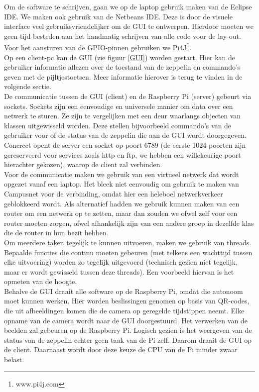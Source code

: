 \documentclass[eind]{penoverslag}
\begin{document}
Om de software te schrijven, gaan we op de laptop gebruik maken van de Eclipse IDE. We maken ook gebruik van de Netbeans IDE. Deze is door de visuele interface veel gebruiksvriendelijker om de GUI te ontwerpen. Hierdoor moeten we geen tijd besteden aan het handmatig schrijven van alle code voor de lay-out. Voor het aansturen van de GPIO-pinnen gebruiken we Pi4J\footnote{www.pi4j.com}.\\

Op een client-pc kan de GUI (zie figuur \ref{GUI}) worden gestart. Hier kan de gebruiker informatie aflezen over de toestand van de zeppelin en commando's geven met de pijltjestoetsen. Meer informatie hierover is terug te vinden in de volgende sectie. \\

De communicatie tussen de GUI (client) en de Raspberry Pi (server) gebeurt via sockets. Sockets zijn een eenvoudige en universele manier om data over een netwerk te sturen. Ze zijn te vergelijken met een deur waarlangs objecten van klassen uitgewisseld worden. Deze stellen bijvoorbeeld commando's van de gebruiker voor of de status van de zeppelin die aan de GUI wordt doorgegeven. Concreet opent de server een socket op poort 6789 (de eerste 1024 poorten zijn gereserveerd voor services zoals http en ftp, we hebben een willekeurige poort hierachter gekozen), waarop de client zal verbinden. \\

Voor de communicatie maken we gebruik van een virtueel netwerk dat wordt opgezet vanaf een laptop. Het bleek niet eenvoudig om gebruik te maken van Campusnet voor de verbinding, omdat hier een heleboel netwerkverkeer geblokkeerd wordt. Als alternatief hadden we gebruik kunnen maken van een router om een netwerk op te zetten, maar dan zouden we ofwel zelf voor een router moeten zorgen, ofwel afhankelijk zijn van een andere groep in dezelfde klas die de router in hun bezit hebben. \\

Om meerdere taken tegelijk te kunnen uitvoeren, maken we gebruik van threads. Bepaalde functies die continu moeten gebeuren (met telkens een wachttijd tussen elke uitvoering) worden zo tegelijk uitgevoerd (technisch gezien niet tegelijk, maar er wordt gewisseld tussen deze threads). Een voorbeeld hiervan is het opmeten van de hoogte.\\

Behalve de GUI draait alle software op de Raspberry Pi, omdat die autonoom moet kunnen werken. Hier worden beslissingen genomen op basis van QR-codes, die uit afbeeldingen komen die de camera op geregelde tijdstippen neemt. Elke opname van de camera wordt naar de GUI doorgestuurd. Het verwerken van de beelden zal gebeuren op de Raspberry Pi. Logisch gezien is het weergeven van de status van de zeppelin echter geen taak van de Pi zelf. Daarom draait de GUI op de client. Daarnaast wordt door deze keuze de CPU van de Pi minder zwaar belast. \\
\end{document}
